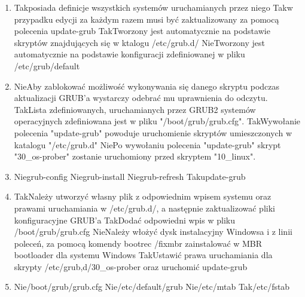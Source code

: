 \begin{enumerate}
	\item {}
	{Tak}{posiada definicje wszystkich systemów uruchamianych przez niego}
	{Tak}{w przypadku edycji za każdym razem musi być zaktualizowany za pomocą polecenia update-grub}
	{Tak}{Tworzony jest automatycznie na podstawie skryptów znajdujących się w ktalogu /etc/grub.d/}
	{Nie}{Tworzony jest automatycznie na podstawie konfiguracji zdefiniowanej w pliku /etc/grub/default}
	
	\newpage

	\item {}
	{Nie}{Aby zablokować możliwość wykonywania się danego skryptu podczas aktualizacji GRUB'a wystarczy odebrać mu uprawnienia do odczytu.}
	{Tak}{Lista zdefiniowanych, uruchamianych przez GRUB2 systemów operacyjnych zdefiniowana jest w pliku "/boot/grub/grub.cfg".}
	{Tak}{Wywołanie polecenia "update-grub" powoduje uruchomienie skryptów umieszczonych w katalogu "/etc/grub.d"}
	{Nie}{Po wywołaniu polecenia "update-grub" skrypt "30\_os-prober" zostanie uruchomiony przed skryptem "10\_linux".}
	
	\item {}
	{Nie}{grub-config}
	{Nie}{grub-install}
	{Nie}{grub-refresh}
	{Tak}{update-grub}
	
	\item {}
	{Tak}{Należy utworzyć własny plik z odpowiednim wpisem systemu oraz prawami uruchamiania w /etc/grub.d/, a następnie zaktualizować pliki konfiguracyjne GRUB'a}
	{Tak}{Dodać odpowiedni wpis w pliku /boot/grub/grub.cfg}
	{Nie}{Należy włożyć dysk instalacyjny Windowsa i z linii poleceń, za pomocą komendy bootrec /fixmbr zainstalować w MBR bootloader dla systemu Windows}
	{Tak}{Ustawić prawa uruchamiania dla skrypty /etc/grub,d/30\_os-prober oraz uruchomić update-grub}

	\item {}
	{Nie}{/boot/grub/grub.cfg}
	{Nie}{/etc/default/grub}
	{Nie}{/etc/mtab}
	{Tak}{/etc/fstab}
	

\end{enumerate}
